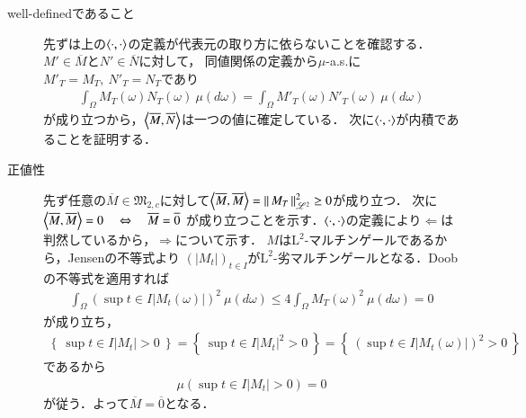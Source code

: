 	\begin{prf}\mbox{}
		\begin{description}
			\item[well-definedであること]
				先ずは上の$\inprod<\cdot,\cdot>$の定義が代表元の取り方に依らないことを確認する．
				$M' \in \overline{M}$と$N' \in \overline{N}$に対して，
				同値関係の定義から$\mu$-a.s.に$M'_T = M_T,\ N'_T = N_T$であり
				\begin{align}
					\int_{\Omega} M_T(\omega)N_T(\omega)\ \mu(d\omega) = \int_{\Omega} M'_T(\omega)N'_T(\omega)\ \mu(d\omega)
				\end{align}
				が成り立つから，$\inprod<\overline{M},\overline{N}>$は一つの値に確定している．
				次に$\inprod<\cdot,\cdot>$が内積であることを証明する．
	
			\item[正値性]
				先ず任意の$\overline{M} \in \mathfrak{M}_{2,c}$に対して$\inprod<\overline{M},\overline{M}> = \Norm{M_T}{\mathscr{L}^2}^2 \geq 0$が成り立つ．
				次に$\inprod<\overline{M},\overline{M}> = 0 \quad \Leftrightarrow \quad \overline{M} = \overline{0}$
				が成り立つことを示す．$\inprod<\cdot,\cdot>$の定義により$\Leftarrow$は判然しているから，$\Rightarrow$について示す．
				$M$は$\mathrm{L}^2$-マルチンゲールであるから，Jensenの不等式より
				$(|M_t|)_{t \in I}$が$\mathrm{L}^2$-劣マルチンゲールとなる．Doobの不等式を適用すれば
				\begin{align}
					\int_{\Omega} \left( \sup{t \in I}{|M_t(\omega)|} \right)^2\ \mu(d\omega) \leq 4 \int_{\Omega} {M_T(\omega)}^2\ \mu(d\omega) = 0
				\end{align}
				が成り立ち，
				\begin{align}
					\left\{\ \sup{t \in I}{|M_t|} > 0\ \right\} = \left\{\ \sup{t \in I}{|M_t|^2} > 0\ \right\} = \left\{\ \left(\sup{t \in I}{|M_t(\omega)|}\right)^2 > 0\ \right\}
				\end{align}
				であるから
				\begin{align}
					\mu\left( \sup{t \in I}{|M_t|} > 0 \right) = 0
				\end{align}
				が従う．よって$\overline{M} = \overline{0}$となる．
	

\end{description}
\end{prf}
